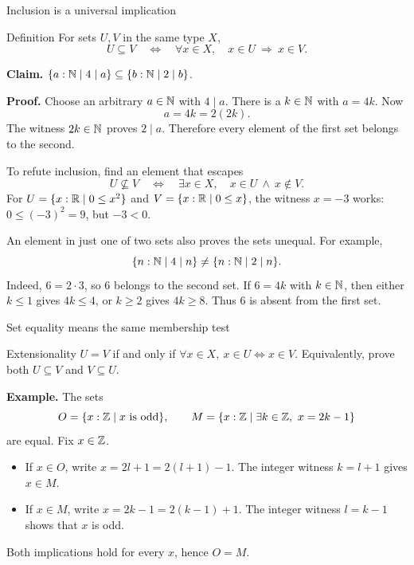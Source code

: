 \begin{frame}{Inclusion is a universal implication}
\begin{block}{Definition}
For sets $U,V$ in the same type $X$,
\[
 U\subseteq V\quad\Longleftrightarrow\quad
 \forall x\in X,\quad x\in U\ \Longrightarrow\ x\in V.
\]
\end{block}
\textbf{Claim.} $\{a:\mathbb{N}\mid4\mid a\}\subseteq\{b:\mathbb{N}\mid2\mid b\}$.
\medskip

\textbf{Proof.} Choose an arbitrary $a\in\mathbb{N}$ with $4\mid a$.
There is a $k\in\mathbb{N}$ with $a=4k$. Now
\[
 a=4k=2(2k).
\]
The witness $2k\in\mathbb{N}$ proves $2\mid a$. Therefore every element of the first set
belongs to the second.
\end{frame}

\begin{frame}{To refute inclusion, find an element that escapes}
\[
 U\not\subseteq V\quad\Longleftrightarrow\quad
 \exists x\in X,\quad x\in U\ \land\ x\notin V.
\]
For $U=\{x:\mathbb{R}\mid0\le x^2\}$ and $V=\{x:\mathbb{R}\mid0\le x\}$,
the witness $x=-3$ works: $0\le(-3)^2=9$, but $-3<0$.
\medskip

An element in just one of two sets also proves the sets unequal.
For example,
\[
 \{n:\mathbb{N}\mid4\mid n\}\ne\{n:\mathbb{N}\mid2\mid n\}.
\]
Indeed, $6=2\cdot3$, so $6$ belongs to the second set.
If $6=4k$ with $k\in\mathbb{N}$, then either $k\le1$ gives $4k\le4$, or $k\ge2$ gives
$4k\ge8$. Thus $6$ is absent from the first set.
\end{frame}

\begin{frame}{Set equality means the same membership test}
\begin{block}{Extensionality}
$U=V$ if and only if $\forall x\in X,\ x\in U\iff x\in V$.
Equivalently, prove both $U\subseteq V$ and $V\subseteq U$.
\end{block}
\textbf{Example.} The sets
\[
 O=\{x:\mathbb{Z}\mid x\text{ is odd}\},\qquad
 M=\{x:\mathbb{Z}\mid\exists k\in\mathbb{Z},\ x=2k-1\}
\]
are equal. Fix $x\in\mathbb{Z}$.
\begin{itemize}
\item If $x\in O$, write $x=2l+1=2(l+1)-1$. The integer witness $k=l+1$ gives $x\in M$.
\item If $x\in M$, write $x=2k-1=2(k-1)+1$. The integer witness $l=k-1$ shows that $x$ is odd.
\end{itemize}
Both implications hold for every $x$, hence $O=M$.
\end{frame}

